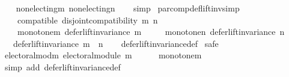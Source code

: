 \begin{isabellebody}
%
\isadelimproof
\ \ %
\endisadelimproof
%
\isatagproof
{}\isamarkupfalse%
\ non{\isacharunderscore}{\kern0pt}electing{\isacharunderscore}{\kern0pt}m\ non{\isacharunderscore}{\kern0pt}electing{\isacharunderscore}{\kern0pt}n\isanewline
\ \ \isamarkupfalse%
\ simp%
\endisatagproof
{\isafoldproof}%
%
\isadelimproof
\isanewline
%
\endisadelimproof
\isanewline
\isanewline
{}\isamarkupfalse%
\ par{\isacharunderscore}{\kern0pt}comp{\isacharunderscore}{\kern0pt}def{\isacharunderscore}{\kern0pt}lift{\isacharunderscore}{\kern0pt}inv{\isacharbrackleft}{\kern0pt}simp{\isacharbrackright}{\kern0pt}{\isacharcolon}{\kern0pt}\isanewline
\ \ \isanewline
\ \ \ \ compatible{\isacharcolon}{\kern0pt}\ {\isachardoublequoteopen}disjoint{\isacharunderscore}{\kern0pt}compatibility\ m\ n{\isachardoublequoteclose}\ \isanewline
\ \ \ \ monotone{\isacharunderscore}{\kern0pt}m{\isacharcolon}{\kern0pt}\ {\isachardoublequoteopen}defer{\isacharunderscore}{\kern0pt}lift{\isacharunderscore}{\kern0pt}invariance\ m{\isachardoublequoteclose}\ \isanewline
\ \ \ \ monotone{\isacharunderscore}{\kern0pt}n{\isacharcolon}{\kern0pt}\ {\isachardoublequoteopen}defer{\isacharunderscore}{\kern0pt}lift{\isacharunderscore}{\kern0pt}invariance\ n{\isachardoublequoteclose}\isanewline
\ \ \ {\isachardoublequoteopen}defer{\isacharunderscore}{\kern0pt}lift{\isacharunderscore}{\kern0pt}invariance\ {\isacharparenleft}{\kern0pt}m\ {\isasymparallel}\isactrlsub {\isasymup}\ n{\isacharparenright}{\kern0pt}{\isachardoublequoteclose}\isanewline
%
\isadelimproof
\ \ %
\endisadelimproof
%
\isatagproof
{}\isamarkupfalse%
\ defer{\isacharunderscore}{\kern0pt}lift{\isacharunderscore}{\kern0pt}invariance{\isacharunderscore}{\kern0pt}def\isanewline
{}\isamarkupfalse%
\ {\isacharparenleft}{\kern0pt}safe{\isacharparenright}{\kern0pt}\isanewline
\ \ \isamarkupfalse%
\ electoral{\isacharunderscore}{\kern0pt}mod{\isacharunderscore}{\kern0pt}m{\isacharcolon}{\kern0pt}\ {\isachardoublequoteopen}electoral{\isacharunderscore}{\kern0pt}module\ m{\isachardoublequoteclose}\isanewline
\ \ \ \ \isamarkupfalse%
\ monotone{\isacharunderscore}{\kern0pt}m\isanewline
\ \ \ \ \isamarkupfalse%
\ {\isacharparenleft}{\kern0pt}simp\ add{\isacharcolon}{\kern0pt}\ defer{\isacharunderscore}{\kern0pt}lift{\isacharunderscore}{\kern0pt}invariance{\isacharunderscore}{\kern0pt}def{\isacharparenright}{\kern0pt}\isanewline
\ \ \isamarkupfalse%

\end{isabellebody}
